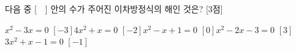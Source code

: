 다음 중 [\ \ ] 안의 수가 주어진 이차방정식의 해인 것은? \mbox{[3점]}
\begin{choicesv}{$x^2-3x=0$ \quad $[-3]$}{$4x^2+x=0$ \quad $[-2]$}{$x^2-x+1=0$ \quad $[0]$}{$x^2-2x-3=0$ \quad $[3]$}{$3x^2+x-1=0$ \quad $[-1]$}\end{choicesv}
